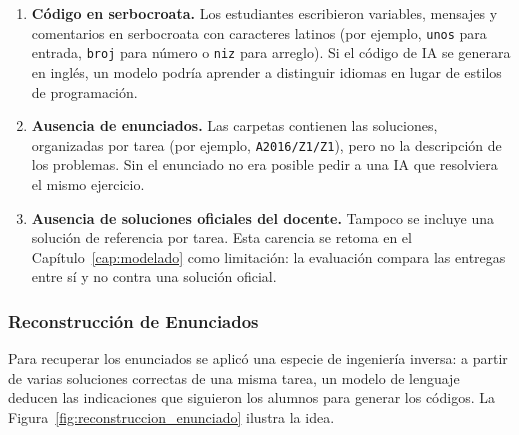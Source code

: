 \begin{enumerate}
    \item \textbf{Código en serbocroata.}
    Los estudiantes escribieron variables, mensajes y comentarios en serbocroata con caracteres latinos (por ejemplo, \texttt{unos} para entrada, \texttt{broj} para número o \texttt{niz} para arreglo). Si el código de IA se generara en inglés, un modelo podría aprender a distinguir idiomas en lugar de estilos de programación.

    \item \textbf{Ausencia de enunciados.}
    Las carpetas contienen las soluciones, organizadas por tarea (por ejemplo, \texttt{A2016/Z1/Z1}), pero no la descripción de los problemas. Sin el enunciado no era posible pedir a una IA que resolviera el mismo ejercicio.

    \item \textbf{Ausencia de soluciones oficiales del docente.}
    Tampoco se incluye una solución de referencia por tarea. Esta carencia se retoma en el Capítulo~\ref{cap:modelado} como limitación: la evaluación compara las entregas entre sí y no contra una solución oficial.
\end{enumerate}


\subsubsection{Reconstrucción de Enunciados}
\label{subsec:ingenieria_inversa}

Para recuperar los enunciados se aplicó una especie de ingeniería inversa: a partir de varias soluciones correctas de una misma tarea, un modelo de lenguaje deducen las indicaciones que siguieron los alumnos para generar los códigos. La Figura~\ref{fig:reconstruccion_enunciado} ilustra la idea. 

